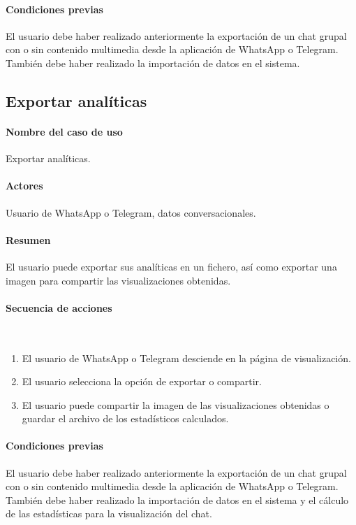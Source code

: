 \paragraph{Condiciones previas} El usuario debe haber realizado anteriormente la exportación de un chat grupal con o sin contenido multimedia desde la aplicación de WhatsApp o Telegram. También debe haber realizado la importación de datos en el sistema.

\subsection{Exportar analíticas}

\paragraph{Nombre del caso de uso} Exportar analíticas.
\paragraph{Actores} Usuario de WhatsApp o Telegram, datos conversacionales.
\paragraph{Resumen} El usuario puede exportar sus analíticas en un fichero, así como exportar una imagen para compartir las visualizaciones obtenidas.
\paragraph{Secuencia de acciones}\mbox{}\\

\begin{enumerate}
	\item El usuario de WhatsApp o Telegram desciende en la página de visualización.
	\item El usuario selecciona la opción de exportar o compartir.
	\item El usuario puede compartir la imagen de las visualizaciones obtenidas o guardar el archivo de los estadísticos calculados.
\end{enumerate}

\paragraph{Condiciones previas} El usuario debe haber realizado anteriormente la exportación de un chat grupal con o sin contenido multimedia desde la aplicación de WhatsApp o Telegram. También debe haber realizado la importación de datos en el sistema y el cálculo de las estadísticas para la visualización del chat.



